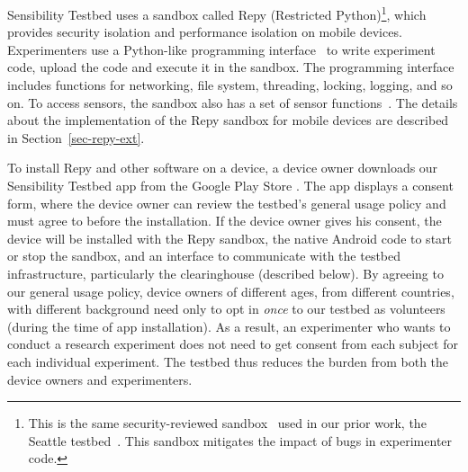 Sensibility Testbed uses a sandbox called Repy (Restricted 
Python)\footnote{\scriptsize This is the 
same security-reviewed sandbox~\cite{cappos2010retaining} used in
our prior work, the Seattle testbed~\cite{seattle}. This sandbox
mitigates the impact of bugs in experimenter code.}, which 
provides security isolation and performance isolation on mobile devices.
Experimenters use a Python-like programming interface~\cite{repyv2}
to write experiment code, upload the code and execute it in the
sandbox. The programming interface includes functions for networking, 
file system, threading, locking, logging, and so on. To access sensors, 
the sandbox also has a set of sensor functions~\cite{sensors}. The
details about the implementation of the Repy sandbox for mobile 
devices are described in Section~\ref{sec-repy-ext}.

To install Repy and other software on a device, a device owner downloads 
our Sensibility Testbed app from the Google Play Store \cite{sensibility-app}.
The app displays a consent form,  where the device owner can review
the testbed's general usage policy  and must 
agree to before the installation. If the device owner gives his
consent, the device will be installed with the Repy sandbox, the native Android code to 
start or stop the sandbox, and an interface to communicate with the testbed 
infrastructure, particularly the clearinghouse (described below). 
By agreeing to our general usage policy, device 
owners of different ages, from different countries, with different
background need only to opt in \textit{once} to our testbed as 
volunteers (during the time of app installation). As a result, an 
experimenter who wants to conduct a research experiment 
does not need to get consent from each subject for each individual
experiment. The testbed thus reduces the burden from both the 
device owners and experimenters. 

